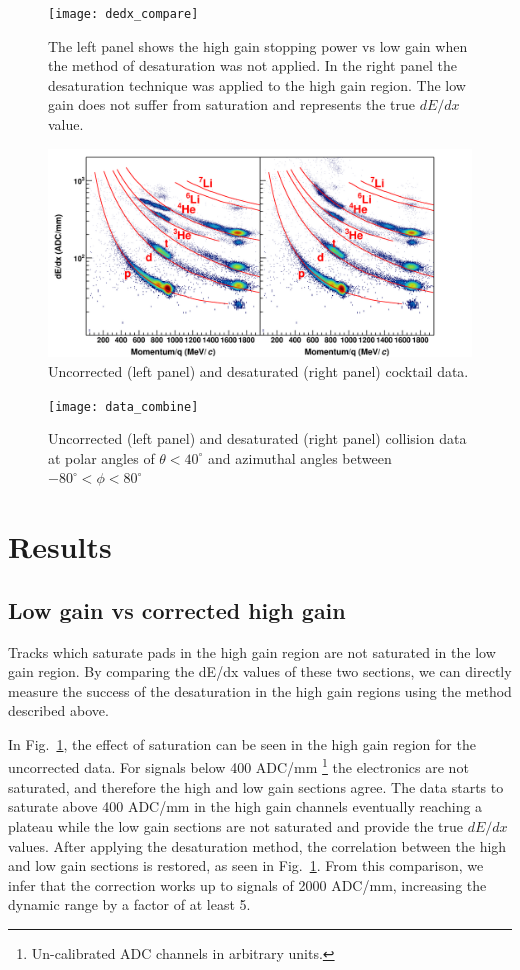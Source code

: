 \documentclass[review]{elsarticle}
\begin{document}
\begin{figure}[t]
\centering
\texttt{[image: dedx\_compare]}
\caption{The left panel shows the high gain stopping power vs low gain when the method of desaturation was not applied. In the right panel the desaturation technique was applied to the high gain region. The low gain does not suffer from saturation and represents the true $dE/dx$ value.}
\label{fig:lowvshigh}
\end{figure}

\begin{figure}[t]
\includegraphics[width=\linewidth]{cocktail_combine.png}
\caption{Uncorrected (left panel) and desaturated (right panel) cocktail data.}
\label{fig:cocktail_combine}
\end{figure}

\begin{figure}[t]
\texttt{[image: data\_combine]}
\caption{Uncorrected (left panel) and desaturated (right panel) collision data at polar angles of $\theta < 40^{\circ}$ and azimuthal angles between $-80^{\circ} < \phi < 80^{\circ}$}
\label{fig:data_combine}
\end{figure}

\section{Results}
\subsection{Low gain vs corrected high gain}

Tracks which saturate pads in the high gain region are not saturated in the low gain region. By comparing the dE/dx values of these two sections, we can directly measure the success of the desaturation in the high gain regions using the method described above.  
 
In Fig.~\ref{fig:lowvshigh}, the effect of saturation can be seen in the high gain region for the uncorrected data. For signals below 400 ADC/mm \footnote{Un-calibrated ADC channels in arbitrary units.} the electronics are not saturated, and therefore the high and low gain sections agree. The data starts to saturate above 400 ADC/mm in the high gain channels eventually reaching a plateau while the low gain sections are not saturated and provide the true $dE/dx$ values.
 After applying the desaturation method, the correlation between the high and low gain sections is restored, as seen in Fig.~\ref{fig:lowvshigh}. From this comparison, we infer that the correction works up to signals of 2000 ADC/mm, increasing the dynamic range by a factor of at least 5.
\end{document}
